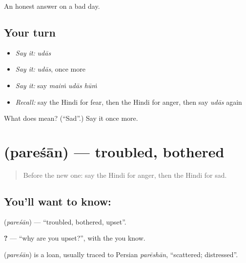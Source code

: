 \begin{grammarlens}[title={What you've built}]
An honest answer on a bad day.
\end{grammarlens}

\subsection*{Your turn}
\begin{itemize}
\raggedright
  \item \emph{Say it:} \emph{udās}
  \item \emph{Say it:} \emph{udās}, once more
  \item \emph{Say it:} say \emph{maiṁ udās hūṁ}
  \item \emph{Recall:} say the Hindi for fear, then the Hindi for anger, then say \emph{udās} again
\end{itemize}

\begin{tcolorbox}[breakable,colback=teal!4,colframe=teal!35!black,title={Before you move on}]
What does  mean? (\textquotedblleft{}Sad\textquotedblright{}.) Say it once more.
\end{tcolorbox}
\section[\texorpdfstring{\hi{परेशान} (pareśān)}{परेशान (pareśān)}]{ (pareśān) — troubled, bothered}

\label{lesson:HI-C108-pareshan}



\begin{quote}
Before the new one: say the Hindi for anger, then the Hindi for sad.
\end{quote}

\subsection*{You'll want to know: }
\textbf{} (\emph{pareśān}) — \textquotedblleft{}troubled, bothered, upset\textquotedblright{}.

\textbf{   ?} — \textquotedblleft{}why are you upset?\textquotedblright{}, with the \textbf{} you know.

\begin{cousinweb}
\textbf{} (\emph{pareśān}) is a loan, usually traced to Persian \emph{parēshān}, \textquotedblleft{}scattered; distressed\textquotedblright{}.
\end{cousinweb}

